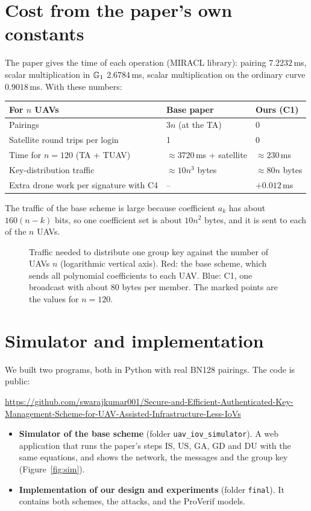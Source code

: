 \documentclass[11pt,openany]{report}
\newcommand{\repo}{https://github.com/swarajkumar001/Secure-and-Efficient-Authenticated-Key-Management-Scheme-for-UAV-Assisted-Infrastructure-Less-IoVs}
\begin{document}
\section{Cost from the paper's own constants}
The paper gives the time of each operation (MIRACL library): pairing $7.2232$\,ms, scalar multiplication in $\mathbb{G}_1$ $2.6784$\,ms, scalar multiplication on
the ordinary curve $0.9018$\,ms. With these numbers:
\begin{center}
\small
\begin{tabularx}{\linewidth}{@{}X l l@{}}
\toprule
\textbf{For $n$ UAVs} & \textbf{Base paper} & \textbf{Ours (C1)}\\
\midrule
Pairings & $3n$ (at the TA) & 0\\
Satellite round trips per login & 1 & 0\\
Time for $n=120$ (TA + TUAV) & $\approx3720$\,ms + satellite & $\approx230$\,ms\\
Key-distribution traffic & $\approx10n^3$ bytes & $\approx80n$ bytes\\
Extra drone work per signature with C4 & -- & $+0.012$\,ms\\
\bottomrule
\end{tabularx}
\end{center}
The traffic of the base scheme is large because coefficient $a_k$ has about $160(n-k)$ bits, so one coefficient set is about $10n^2$ bytes, and it is
sent to each of the $n$ UAVs.

\begin{figure}[H]
\centering

\caption{Traffic needed to distribute one group key against the number of UAVs $n$ (logarithmic vertical axis). Red: the base scheme, which sends all
polynomial coefficients to each UAV. Blue: C1, one broadcast with about 80 bytes per member. The marked points are the values for $n=120$.}
\label{fig:traffic}
\end{figure}

\section{Simulator and implementation}
We built two programs, both in Python with real BN128 pairings. The code is public:
\begin{center}
\scriptsize\url{\repo}
\end{center}
\begin{itemize}[leftmargin=*]
\item \textbf{Simulator of the base scheme} (folder \texttt{uav\_iov\_simulator}). A web application that runs the paper's steps IS, US, GA, GD and DU
with the same equations, and shows the network, the messages and the group key (Figure~\ref{fig:sim}).
\item \textbf{Implementation of our design and experiments} (folder \texttt{final}). It contains both schemes, the attacks, and the ProVerif models.
\end{itemize}
\end{document}
